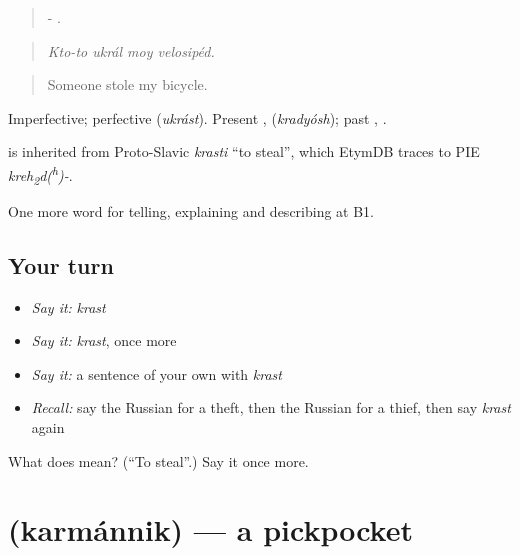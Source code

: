 \begin{quote}
-   .
\end{quote}

\begin{quote}
\emph{Kto-to ukrál moy velosipéd.}
\end{quote}

\begin{quote}
Someone stole my bicycle.
\end{quote}

Imperfective; perfective \emph{} (\emph{ukrást}). Present \emph{}, \emph{} (\emph{kradyósh}); past \emph{}, \emph{}.

\begin{cousinweb}
\emph{} is inherited from Proto-Slavic \emph{krasti} \textquotedblleft{}to steal\textquotedblright{}, which EtymDB traces to PIE \emph{kreh\textsubscript{2}d(\textsuperscript{h})-}.
\end{cousinweb}

\begin{grammarlens}[title={What you've built}]
One more word for telling, explaining and describing at B1.
\end{grammarlens}

\subsection*{Your turn}
\begin{itemize}
\raggedright
  \item \emph{Say it:} \emph{krast}
  \item \emph{Say it:} \emph{krast}, once more
  \item \emph{Say it:} a sentence of your own with \emph{krast}
  \item \emph{Recall:} say the Russian for a theft, then the Russian for a thief, then say \emph{krast} again
\end{itemize}

\begin{tcolorbox}[breakable,colback=teal!4,colframe=teal!35!black,title={Before you move on}]
What does  mean? (\textquotedblleft{}To steal\textquotedblright{}.) Say it once more.
\end{tcolorbox}
\section[\texorpdfstring{\ru{карманник} (karmánnik)}{карманник (karmánnik)}]{ (karmánnik) — a pickpocket}

